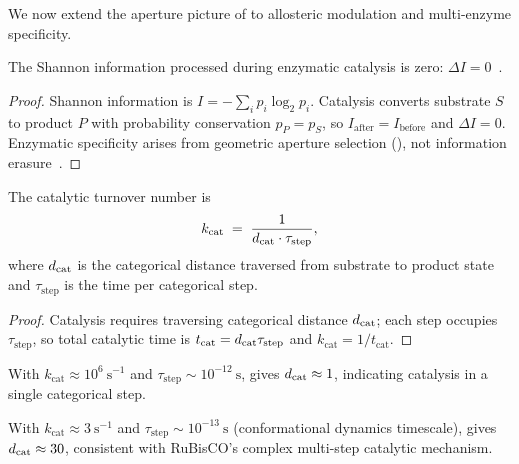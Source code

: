 We now extend the aperture picture of  to allosteric
modulation and multi-enzyme specificity.

\begin{theorem}
\label{thm:ch03-zero-info}
The Shannon information processed during enzymatic catalysis is zero:
$\Delta I = 0$~\citep{Shannon1948}.
\end{theorem}

\begin{proof}
Shannon information is $I=-\sum_i p_i\log_2 p_i$.  Catalysis converts substrate
$S$ to product $P$ with probability conservation $p_P=p_S$, so
$I_\mathrm{after}=I_\mathrm{before}$ and $\Delta I=0$.  Enzymatic specificity
arises from geometric aperture selection (), not information
erasure~\citep{Landauer1961}.
\end{proof}

\begin{theorem}
\label{thm:ch03-kcat}
The catalytic turnover number is
\begin{equation}
    k_\mathrm{cat} \;=\; \frac{1}{d_{\mathrm{cat}}\cdot\tau_\mathrm{step}},
    \label{eq:ch03-kcat}
\end{equation}
where $d_{\mathrm{cat}}$ is the categorical distance traversed from substrate to product
state and $\tau_\mathrm{step}$ is the time per categorical step.
\end{theorem}

\begin{proof}
Catalysis requires traversing categorical distance $d_{\mathrm{cat}}$; each step occupies
$\tau_\mathrm{step}$, so total catalytic time is $t_\mathrm{cat}=d_{\mathrm{cat}}\tau_\mathrm{step}$
and $k_\mathrm{cat}=1/t_\mathrm{cat}$.
\end{proof}

\begin{example}
With $k_\mathrm{cat}\approx 10^6~\mathrm{s}^{-1}$ and
$\tau_\mathrm{step}\sim 10^{-12}~\mathrm{s}$,  gives
$d_{\mathrm{cat}}\approx 1$, indicating catalysis in a single categorical step.
\end{example}

\begin{example}[RuBisCO]
With $k_\mathrm{cat}\approx 3~\mathrm{s}^{-1}$ and
$\tau_\mathrm{step}\sim 10^{-13}~\mathrm{s}$ (conformational dynamics
timescale),  gives $d_{\mathrm{cat}}\approx 30$, consistent with
RuBisCO's complex multi-step catalytic mechanism.
\end{example}

